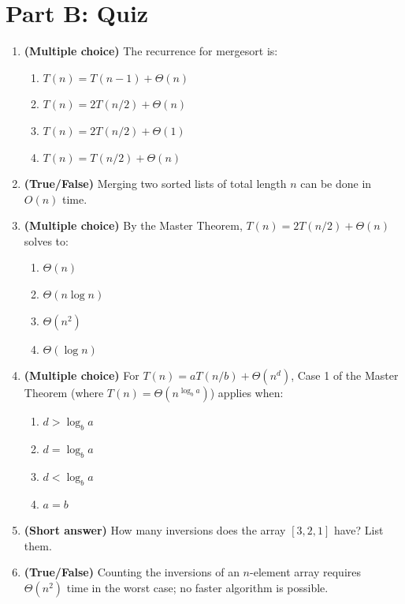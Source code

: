 \documentclass[11pt]{article}
\begin{document}
\newpage
\section*{Part B: Quiz}

\begin{enumerate}[label=\textbf{B\arabic*.}, leftmargin=2.2em]

\item \textbf{(Multiple choice)} The recurrence for mergesort is:
\begin{enumerate}[label=(\alph*)]
    \item $T(n) = T(n-1) + \Theta(n)$
    \item $T(n) = 2T(n/2) + \Theta(n)$
    \item $T(n) = 2T(n/2) + \Theta(1)$
    \item $T(n) = T(n/2) + \Theta(n)$
\end{enumerate}

\item \textbf{(True/False)} Merging two sorted lists of total length $n$ can be done in
$O(n)$ time.

\item \textbf{(Multiple choice)} By the Master Theorem, $T(n) = 2T(n/2) + \Theta(n)$ solves
to:
\begin{enumerate}[label=(\alph*)]
    \item $\Theta(n)$
    \item $\Theta(n \log n)$
    \item $\Theta(n^2)$
    \item $\Theta(\log n)$
\end{enumerate}

\item \textbf{(Multiple choice)} For $T(n) = a T(n/b) + \Theta(n^d)$, Case 1 of the Master
Theorem (where $T(n) = \Theta(n^{\log_b a})$) applies when:
\begin{enumerate}[label=(\alph*)]
    \item $d > \log_b a$
    \item $d = \log_b a$
    \item $d < \log_b a$
    \item $a = b$
\end{enumerate}

\item \textbf{(Short answer)} How many inversions does the array $[3, 2, 1]$ have? List
them.

\item \textbf{(True/False)} Counting the inversions of an $n$-element array requires
$\Theta(n^2)$ time in the worst case; no faster algorithm is possible.


\end{enumerate}
\end{document}
